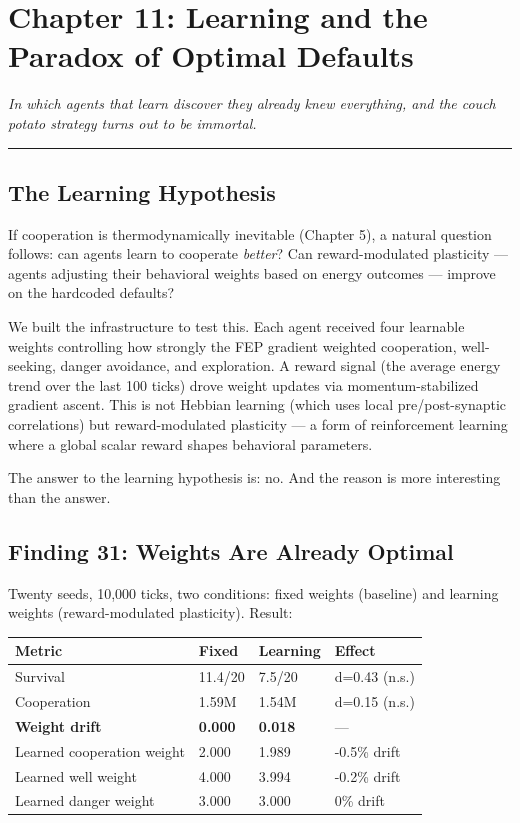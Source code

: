 \chapter{Chapter 11: Learning and the Paradox of Optimal Defaults}\label{chapter-11-learning-and-the-paradox-of-optimal-defaults}

\emph{In which agents that learn discover they already knew everything, and the couch potato strategy turns out to be immortal.}

\begin{center}\rule{0.5\linewidth}{0.5pt}\end{center}

\section{The Learning Hypothesis}\label{the-learning-hypothesis}

If cooperation is thermodynamically inevitable (Chapter 5), a natural question follows: can agents learn to cooperate \emph{better}? Can reward-modulated plasticity --- agents adjusting their behavioral weights based on energy outcomes --- improve on the hardcoded defaults?

We built the infrastructure to test this. Each agent received four learnable weights controlling how strongly the FEP gradient weighted cooperation, well-seeking, danger avoidance, and exploration. A reward signal (the average energy trend over the last 100 ticks) drove weight updates via momentum-stabilized gradient ascent. This is not Hebbian learning (which uses local pre/post-synaptic correlations) but reward-modulated plasticity --- a form of reinforcement learning where a global scalar reward shapes behavioral parameters.

The answer to the learning hypothesis is: no. And the reason is more interesting than the answer.

\section{Finding 31: Weights Are Already Optimal}\label{finding-31-weights-are-already-optimal}

Twenty seeds, 10,000 ticks, two conditions: fixed weights (baseline) and learning weights (reward-modulated plasticity). Result:

\begin{longtable}[]{@{}llll@{}}
\toprule\noalign{}
Metric & Fixed & Learning & Effect \\
\midrule\noalign{}
\endhead
\bottomrule\noalign{}
\endlastfoot
Survival & 11.4/20 & 7.5/20 & d=0.43 (n.s.) \\
Cooperation & 1.59M & 1.54M & d=0.15 (n.s.) \\
\textbf{Weight drift} & \textbf{0.000} & \textbf{0.018} & --- \\
Learned cooperation weight & 2.000 & 1.989 & -0.5\% drift \\
Learned well weight & 4.000 & 3.994 & -0.2\% drift \\
Learned danger weight & 3.000 & 3.000 & 0\% drift \\
\end{longtable}

